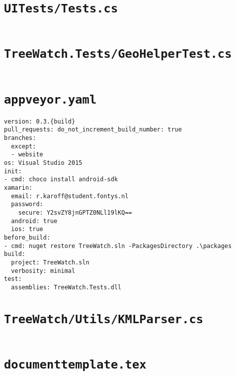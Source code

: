 \documentclass[12pt]{article}
\begin{document}
\section{\texttt{UITests/Tests.cs}}
	\inputminted[linenos,firstline=22]{csharp}{../../../src/UITests/Tests.cs}
	\pagebreak

\section{\texttt{TreeWatch.Tests/GeoHelperTest.cs}}
	\inputminted[linenos,firstline=22]{csharp}{../../../src/TreeWatch.Tests/GeoHelperTest.cs}
	\pagebreak
\section{\texttt{appveyor.yaml}}

\begin{verbatim}
version: 0.3.{build}
pull_requests: do_not_increment_build_number: true
branches:
  except:
  - website
os: Visual Studio 2015
init:
- cmd: choco install android-sdk
xamarin:
  email: r.karoff@student.fontys.nl
  password:
    secure: Y2svZY8jnGPTZ0NLl19lKQ==
  android: true
  ios: true
before_build:
- cmd: nuget restore TreeWatch.sln -PackagesDirectory .\packages
build:
  project: TreeWatch.sln
  verbosity: minimal
test:
  assemblies: TreeWatch.Tests.dll
\end{verbatim}
	\pagebreak
	
\section{\texttt{TreeWatch/Utils/KMLParser.cs}}
	\inputminted[linenos,firstline=22]{csharp}{../../../src/TreeWatch/Utils/KMLParser.cs}
	\pagebreak

\section{\texttt{documenttemplate.tex}}
	\inputminted[linenos,firstline=22]{tex}{../qualitymanagementplan/template/documenttemplate.tex}
	\pagebreak
	
\end{document}
